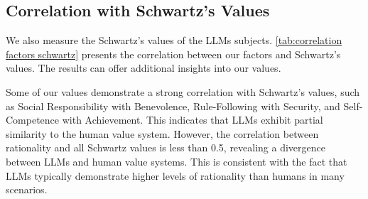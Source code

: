 \subsection{Correlation with Schwartz's Values}

\begin{table}[H]
    \centering
    \caption{Correlation between our values and Schwartz's values.}
    \label{tab:correlation factors schwartz}
\end{table}


We also measure the Schwartz's values \cite{schwartz1992universals} of the LLMs subjects. \cref{tab:correlation factors schwartz} presents the correlation between our factors and Schwartz's values. The results can offer additional insights into our values.

Some of our values demonstrate a strong correlation with Schwartz's values, such as Social Responsibility with Benevolence, Rule-Following with Security, and Self-Competence with Achievement. This indicates that LLMs exhibit partial similarity to the human value system. However, the correlation between rationality and all Schwartz values is less than 0.5, revealing a divergence between LLMs and human value systems. This is consistent with the fact that LLMs typically demonstrate higher levels of rationality than humans in many scenarios.

